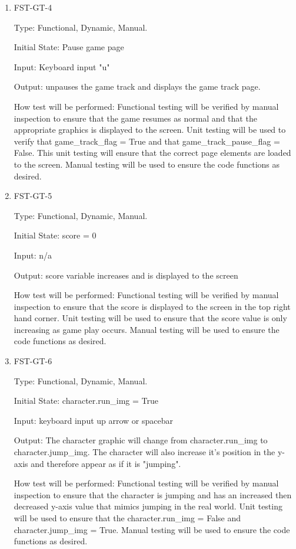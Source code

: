 \documentclass[12pt, titlepage]{article}
\begin{document}
\begin{enumerate}
\item{FST-GT-4\\}

Type: Functional, Dynamic, Manual.
					
Initial State: Pause game page
					
Input: Keyboard input "u"
					
Output: unpauses the game track and displays the game track page. 
					
How test will be performed: Functional testing will be verified by manual inspection to ensure that the game resumes as normal and that the appropriate graphics is displayed to the screen. Unit testing will be used to verify that game\_track\_flag = True and that game\_track\_pause\_flag = False. This unit testing will ensure that the correct page elements are loaded to the screen. Manual testing will be used to ensure the code functions as desired. 

\item{FST-GT-5\\}

Type: Functional, Dynamic, Manual.
					
Initial State: score = 0
					
Input: n/a
					
Output: score variable increases and is displayed to the screen
					
How test will be performed: Functional testing will be verified by manual inspection to ensure that the score is displayed to the screen in the top right hand corner. Unit testing will be used to ensure that the score value is only increasing as game play occurs. Manual testing will be used to ensure the code functions as desired.

\item{FST-GT-6\\}

Type: Functional, Dynamic, Manual.
					
Initial State: character.run\_img = True
					
Input: keyboard input up arrow or spacebar
					
Output: The character graphic will change from character.run\_img to character.jump\_img. The character will also increase it's position in the y-axis and therefore appear as if it is "jumping". 
					
How test will be performed: Functional testing will be verified by manual inspection to ensure that the character is jumping and has an increased then decreased y-axis value that mimics jumping in the real world. Unit testing will be used to ensure that the character.run\_img = False and character.jump\_img = True. Manual testing will be used to ensure the code functions as desired. 


\end{enumerate}
\end{document}
